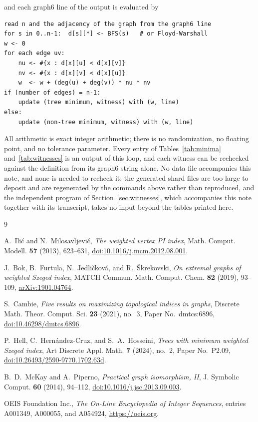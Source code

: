 \documentclass[11pt]{amsart}
\begin{document}
\noindent
and each graph6 line of the output is evaluated by

\begin{verbatim}
read n and the adjacency of the graph from the graph6 line
for s in 0..n-1:  d[s][*] <- BFS(s)   # or Floyd-Warshall
w <- 0
for each edge uv:
    nu <- #{x : d[x][u] < d[x][v]}
    nv <- #{x : d[x][v] < d[x][u]}
    w  <- w + (deg(u) + deg(v)) * nu * nv
if (number of edges) = n-1:
    update (tree minimum, witness) with (w, line)
else:
    update (non-tree minimum, witness) with (w, line)
\end{verbatim}

\noindent
All arithmetic is exact integer arithmetic; there is no randomization,
no floating point, and no tolerance parameter. Every entry of
Tables~\ref{tab:minima} and~\ref{tab:witnesses} is an output of this
loop, and each witness can be rechecked against the definition from
its graph6 string alone. No data file accompanies this note, and none
is needed to recheck it: the generated shard files are too
large to deposit and are regenerated by the commands above rather than
reproduced, and the independent program of
Section~\ref{sec:witnesses}, which accompanies this note together with
its transcript, takes no input beyond the tables printed here.

\begin{thebibliography}{9}

A.~Ili\'c and N.~Milosavljevi\'c,
\emph{The weighted vertex PI index},
Math. Comput. Modell. \textbf{57} (2013), 623--631,
\href{https://doi.org/10.1016/j.mcm.2012.08.001}
{doi:10.1016/j.mcm.2012.08.001}.

J.~Bok, B.~Furtula, N.~Jedli\v{c}kov\'a, and R.~\v{S}krekovski,
\emph{On extremal graphs of weighted Szeged index},
MATCH Commun. Math. Comput. Chem. \textbf{82} (2019), 93--109,
\href{https://arxiv.org/abs/1901.04764}{arXiv:1901.04764}.

S.~Cambie,
\emph{Five results on maximizing topological indices in graphs},
Discrete Math. Theor. Comput. Sci. \textbf{23} (2021), no.~3,
Paper No.~dmtcs:6896,
\href{https://doi.org/10.46298/dmtcs.6896}{doi:10.46298/dmtcs.6896}.

P.~Hell, C.~Hern\'andez-Cruz, and S.~A.~Hosseini,
\emph{Trees with minimum weighted Szeged index},
Art Discrete Appl. Math. \textbf{7} (2024), no.~2,
Paper No.~P2.09,
\href{https://doi.org/10.26493/2590-9770.1702.63d}
{doi:10.26493/2590-9770.1702.63d}.

B.~D.~McKay and A.~Piperno,
\emph{Practical graph isomorphism, II},
J. Symbolic Comput. \textbf{60} (2014), 94--112,
\href{https://doi.org/10.1016/j.jsc.2013.09.003}
{doi:10.1016/j.jsc.2013.09.003}.

OEIS Foundation Inc.,
\emph{The On-Line Encyclopedia of Integer Sequences},
entries A001349, A000055, and A054924,
\url{https://oeis.org}.

\end{thebibliography}
\end{document}
